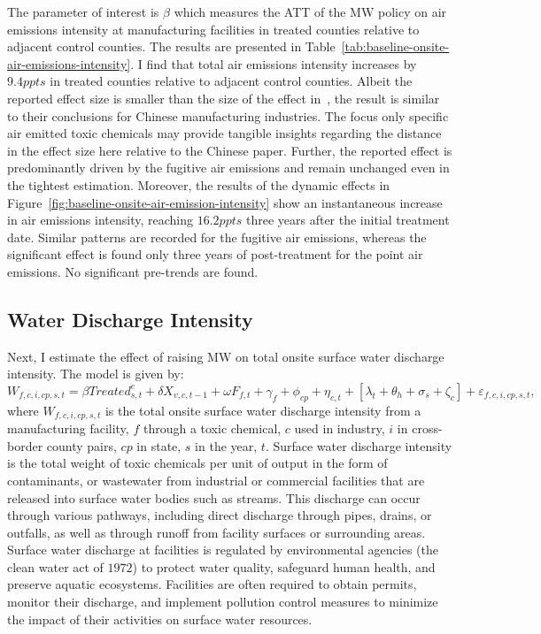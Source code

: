 \documentclass[12pt, english]{article}
\begin{document}
    The parameter of interest is $\beta$ which measures the ATT of the MW policy on air emissions intensity at manufacturing facilities in treated counties relative to adjacent control counties. The results are presented in Table~\ref{tab:baseline-onsite-air-emissions-intensity}. I find that total air emissions intensity increases by $9.4ppts$ in treated counties relative to adjacent control counties. Albeit the reported effect size is smaller than the size of the effect in~\cite{zhang2023unintended}, the result is similar to their conclusions for Chinese manufacturing industries. The focus only specific air emitted toxic chemicals may provide tangible insights regarding the distance in the effect size here relative to the Chinese paper. Further, the reported effect is predominantly driven by the fugitive air emissions and remain unchanged even in the tightest estimation. Moreover, the results of the dynamic effects in Figure~\ref{fig:baseline-onsite-air-emission-intensity} show an instantaneous increase in air emissions intensity, reaching $16.2ppts$ three years after the initial treatment date. Similar patterns are recorded for the fugitive air emissions, whereas the significant effect is found only three years of post-treatment for the point air emissions. No significant pre-trends are found.
    

    \subsection{Water Discharge Intensity}\label{subsec:water-discharge-intensity}
    Next, I estimate the effect of raising MW on total onsite surface water discharge intensity. The model is given by:
    \begin{equation}
        W_{f,c,i,cp,s,t} = \beta Treated_{s,t}^e + \delta X_{v,c,t-1} + \omega F_{f,t} + \gamma_{f} + \phi_{cp} + \eta_{c,t} + \left[\lambda_{t} + \theta_{h} + \sigma_{s} + \zeta_{c} \right] + \varepsilon_{f,c,i,cp,s,t},\label{eq:baseline-onsite-water-discharge-intensity}
    \end{equation}
    where $W_{f,c,i,cp,s,t}$ is the total onsite surface water discharge intensity from a manufacturing facility, $f$ through a toxic chemical, $c$ used in industry, $i$ in cross-border county pairs, $cp$ in state, $s$ in the year, $t$. Surface water discharge intensity is the total weight of toxic chemicals per unit of output in the form of contaminants, or wastewater from industrial or commercial facilities that are released into surface water bodies such as streams. This discharge can occur through various pathways, including direct discharge through pipes, drains, or outfalls, as well as through runoff from facility surfaces or surrounding areas. Surface water discharge at facilities is regulated by environmental agencies (the clean water act of $1972$) to protect water quality, safeguard human health, and preserve aquatic ecosystems. Facilities are often required to obtain permits, monitor their discharge, and implement pollution control measures to minimize the impact of their activities on surface water resources.
    
\end{document}
